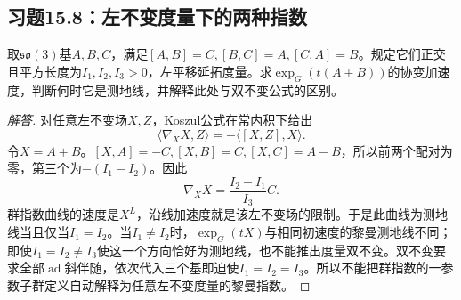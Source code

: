 \subsection*{习题15.8：左不变度量下的两种指数}
取$\mathfrak{so}(3)$基$A,B,C$，满足$[A,B]=C,[B,C]=A,[C,A]=B$。规定它们正交且平方长度为$I_1,I_2,I_3>0$，左平移延拓度量。求$\exp_G(t(A+B))$的协变加速度，判断何时它是测地线，并解释此处与双不变公式的区别。
\begin{proof}[解答]
对任意左不变场$X,Z$，Koszul公式在常内积下给出
\[
 \langle\nabla_XX,Z\rangle=-\langle[X,Z],X\rangle.
\]
令$X=A+B$。$[X,A]=-C,[X,B]=C,[X,C]=A-B$，所以前两个配对为零，第三个为$-(I_1-I_2)$。因此
\[
 \nabla_XX=\frac{I_2-I_1}{I_3}C.
\]
群指数曲线的速度是$X^L$，沿线加速度就是该左不变场的限制。于是此曲线为测地线当且仅当$I_1=I_2$。当$I_1\ne I_2$时，$\exp_G(tX)$与相同初速度的黎曼测地线不同；即使$I_1=I_2\ne I_3$使这一个方向恰好为测地线，也不能推出度量双不变。双不变要求全部$\operatorname{ad}$斜伴随，依次代入三个基即迫使$I_1=I_2=I_3$。所以不能把群指数的一参数子群定义自动解释为任意左不变度量的黎曼指数。
\end{proof}
